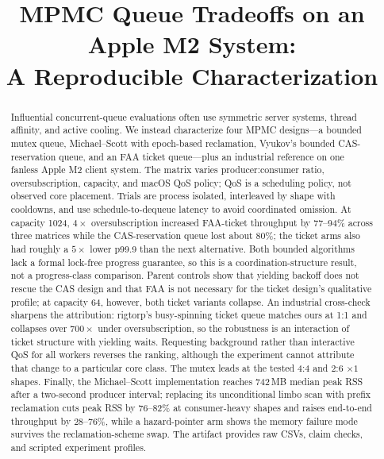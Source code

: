 \documentclass[conference]{IEEEtran}
\begin{document}
\title{MPMC Queue Tradeoffs on an Apple M2 System:\\
A Reproducible Characterization}

\author{
}

\maketitle

\begin{abstract}
Influential concurrent-queue evaluations often use symmetric server systems,
thread affinity, and active cooling. We instead characterize four MPMC
designs---a bounded mutex queue, Michael--Scott with epoch-based reclamation,
Vyukov's bounded CAS-reservation queue, and an FAA ticket queue---plus an
industrial reference on one fanless Apple M2 client system. The matrix varies
producer:consumer ratio, oversubscription, capacity, and macOS QoS policy; QoS
is a scheduling policy, not observed core placement. Trials are process
isolated, interleaved by shape with cooldowns, and use schedule-to-dequeue latency to avoid
coordinated omission. At capacity 1024, $4\times$ oversubscription increased
FAA-ticket throughput by 77--94\% across three matrices while the CAS-reservation
queue lost about 80\%; the ticket arms also had roughly a $5\times$ lower
p99.9 than the next alternative. Both bounded algorithms lack a formal
lock-free progress guarantee, so this is a coordination-structure result, not
a progress-class comparison. Parent controls show that yielding backoff does
not rescue the CAS design and that FAA is not necessary for the ticket design's
qualitative profile; at capacity 64, however, both ticket variants collapse.
An industrial cross-check sharpens the attribution: rigtorp's busy-spinning
ticket queue matches ours at 1:1 and collapses over $700\times$ under
oversubscription, so the robustness is an interaction of ticket structure
with yielding waits.
Requesting background rather than interactive QoS for all workers reverses the ranking,
although the experiment cannot attribute that change to a particular core
class. The mutex leads at the tested 4:4 and 2:6 $\times1$ shapes. Finally, the
Michael--Scott implementation reaches 742\,MB median peak RSS after a two-second
producer interval; replacing its unconditional limbo scan with prefix
reclamation cuts peak RSS by 76--82\% at consumer-heavy shapes and raises
end-to-end throughput by 28--76\%, while a hazard-pointer arm shows the memory
failure mode survives the reclamation-scheme swap. The artifact provides raw
CSVs, claim checks, and scripted experiment profiles.
\end{abstract}
\end{document}
